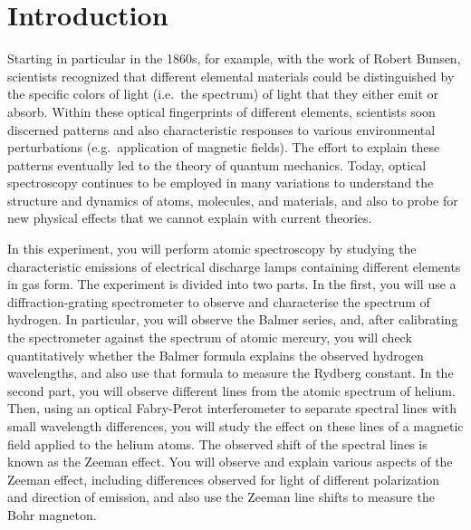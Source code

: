 \documentclass{../lab}
\begin{document}
\maketitle

\tableofcontents

\section{Introduction}



Starting in particular in the 1860s, for example, with the work of Robert Bunsen, scientists recognized that different elemental materials could be distinguished by the specific colors of light (i.e.\ the spectrum) of light that they either emit or absorb.  Within these optical fingerprints of different elements, scientists soon discerned patterns and also characteristic responses to various environmental perturbations (e.g.\ application of magnetic fields).  The effort to explain these patterns eventually led to the theory of quantum mechanics.  Today, optical spectroscopy continues to be employed in many variations to understand the structure and dynamics of atoms, molecules, and materials, and also to probe for new physical effects that we cannot explain with current theories.

In this experiment, you will perform atomic spectroscopy by studying the characteristic emissions of electrical discharge lamps containing different elements in gas form.  The experiment is divided into two parts.  In the first, you will use a diffraction-grating spectrometer to observe and characterise the spectrum of hydrogen.  In particular, you will observe the Balmer series, and, after calibrating the spectrometer against the spectrum of atomic mercury, you will check quantitatively whether the Balmer formula explains the observed hydrogen wavelengths, and also use that formula to measure the Rydberg constant.  In the second part, you will observe different lines from the atomic spectrum of helium.  Then, using an optical Fabry-Perot interferometer to separate spectral lines with small wavelength differences, you will study the effect on these lines of a magnetic field applied to the helium atoms.  The observed shift of the spectral lines is known as the Zeeman effect.  You will observe and explain various aspects of the Zeeman effect, including differences observed for light of different polarization and direction of emission, and also use the Zeeman line shifts to measure the Bohr magneton.
\end{document}
